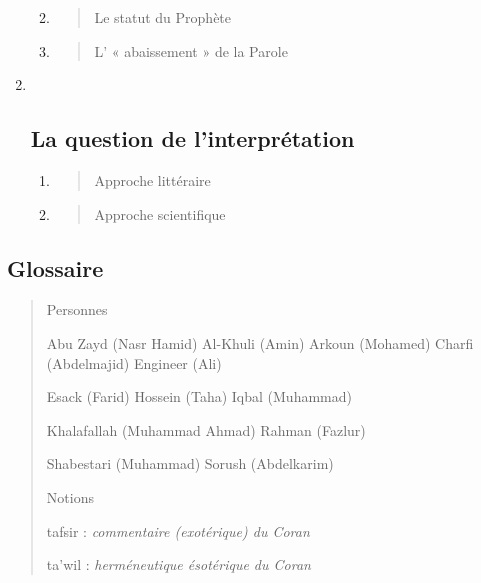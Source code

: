\begin{enumerate}
  \begin{enumerate}
  \def\labelenumii{\arabic{enumii}.}
  \item
    \begin{quote}
    Le statut du Prophète
    \end{quote}
  \item
    \begin{quote}
    L' « abaissement » de la Parole
    \end{quote}
  \end{enumerate}
\item ~
  \hypertarget{la-question-de-linterpruxe9tation}{%
  \subsection{\texorpdfstring{{La question de
  l'interprétation}}{La question de l'interprétation}}\label{la-question-de-linterpruxe9tation}}

  \begin{enumerate}
  \def\labelenumii{\arabic{enumii}.}
  \item
    \begin{quote}
    Approche littéraire
    \end{quote}
  \item
    \begin{quote}
    Approche scientifique
    \end{quote}
  \end{enumerate}
\end{enumerate}

\hypertarget{glossaire-7}{%
\subsection{\texorpdfstring{{Glossaire}}{Glossaire}}\label{glossaire-7}}

\begin{quote}
{Personnes}

Abu Zayd (Nasr Hamid) Al-Khuli (Amin) Arkoun (Mohamed) Charfi
(Abdelmajid) Engineer (Ali)

Esack (Farid) Hossein (Taha) Iqbal (Muhammad)

Khalafallah (Muhammad Ahmad) Rahman (Fazlur)

Shabestari (Muhammad) Sorush (Abdelkarim)

{Notions}

tafsir : \emph{commentaire (exotérique) du Coran}

ta'wil : \emph{herméneutique ésotérique du Coran}
\end{quote}

